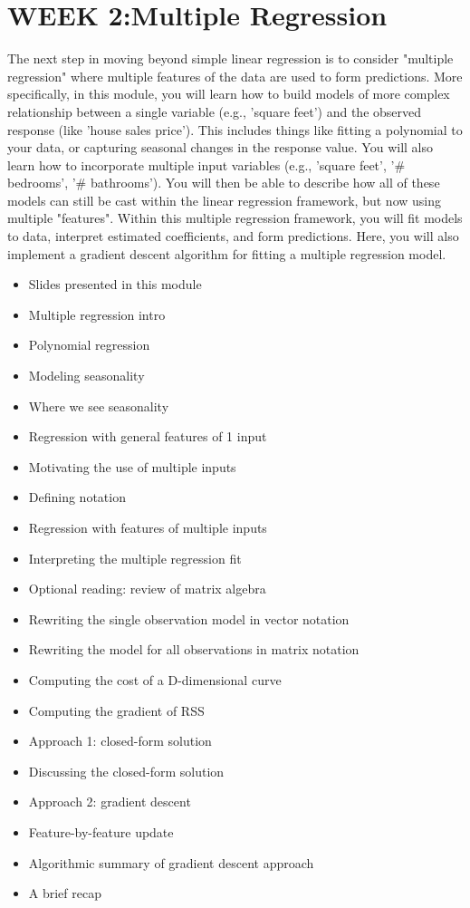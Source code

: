 \section{WEEK 2:Multiple Regression}
The next step in moving beyond simple linear regression is to consider "multiple regression" where multiple features of the data are used to form predictions.
More specifically, in this module, you will learn how to build models of more complex relationship between a single variable (e.g., 'square feet') and the observed response (like 'house sales price'). This includes things like fitting a polynomial to your data, or capturing seasonal changes in the response value. You will also learn how to incorporate multiple input variables (e.g., 'square feet', '# bedrooms', '# bathrooms'). You will then be able to describe how all of these models can still be cast within the linear regression framework, but now using multiple "features". Within this multiple regression framework, you will fit models to data, interpret estimated coefficients, and form predictions.
Here, you will also implement a gradient descent algorithm for fitting a multiple regression model.
\begin{itemize}
\item Slides presented in this module
\item Multiple regression intro
\item Polynomial regression
\item Modeling seasonality
\item Where we see seasonality
\item Regression with general features of 1 input
\item Motivating the use of multiple inputs
\item Defining notation
\item Regression with features of multiple inputs
\item Interpreting the multiple regression fit
\item Optional reading: review of matrix algebra
\item Rewriting the single observation model in vector notation
\item Rewriting the model for all observations in matrix notation
\item Computing the cost of a D-dimensional curve
\item Computing the gradient of RSS
\item Approach 1: closed-form solution
\item Discussing the closed-form solution
\item Approach 2: gradient descent
\item Feature-by-feature update
\item Algorithmic summary of gradient descent approach
\item A brief recap
\end{itemize}
